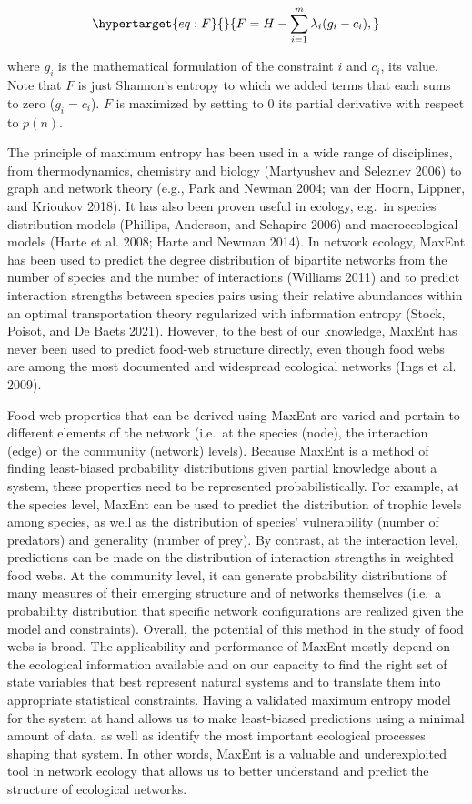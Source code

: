 \documentclass[10pt,oneside]{article}
\begin{document}
\begin{equation}\protect\hypertarget{eq:F}{}{F = H - \sum_{i=1}^m \lambda_i (g_i-c_i),}\label{eq:F}\end{equation}

where \(g_i\) is the mathematical formulation of the constraint \(i\)
and \(c_i\), its value. Note that \(F\) is just Shannon's entropy to
which we added terms that each sums to zero (\(g_i = c_i\)). \(F\) is
maximized by setting to \(0\) its partial derivative with respect to
\(p(n)\).

The principle of maximum entropy has been used in a wide range of
disciplines, from thermodynamics, chemistry and biology (Martyushev and
Seleznev 2006) to graph and network theory (e.g., Park and Newman 2004;
van der Hoorn, Lippner, and Krioukov 2018). It has also been proven
useful in ecology, e.g.~in species distribution models (Phillips,
Anderson, and Schapire 2006) and macroecological models (Harte et al.
2008; Harte and Newman 2014). In network ecology, MaxEnt has been used
to predict the degree distribution of bipartite networks from the number
of species and the number of interactions (Williams 2011) and to predict
interaction strengths between species pairs using their relative
abundances within an optimal transportation theory regularized with
information entropy (Stock, Poisot, and De Baets 2021). However, to the
best of our knowledge, MaxEnt has never been used to predict food-web
structure directly, even though food webs are among the most documented
and widespread ecological networks (Ings et al. 2009).

Food-web properties that can be derived using MaxEnt are varied and
pertain to different elements of the network (i.e.~at the species
(node), the interaction (edge) or the community (network) levels).
Because MaxEnt is a method of finding least-biased probability
distributions given partial knowledge about a system, these properties
need to be represented probabilistically. For example, at the species
level, MaxEnt can be used to predict the distribution of trophic levels
among species, as well as the distribution of species' vulnerability
(number of predators) and generality (number of prey). By contrast, at
the interaction level, predictions can be made on the distribution of
interaction strengths in weighted food webs. At the community level, it
can generate probability distributions of many measures of their
emerging structure and of networks themselves (i.e.~a probability
distribution that specific network configurations are realized given the
model and constraints). Overall, the potential of this method in the
study of food webs is broad. The applicability and performance of MaxEnt
mostly depend on the ecological information available and on our
capacity to find the right set of state variables that best represent
natural systems and to translate them into appropriate statistical
constraints. Having a validated maximum entropy model for the system at
hand allows us to make least-biased predictions using a minimal amount
of data, as well as identify the most important ecological processes
shaping that system. In other words, MaxEnt is a valuable and
underexploited tool in network ecology that allows us to better
understand and predict the structure of ecological networks.
\end{document}
